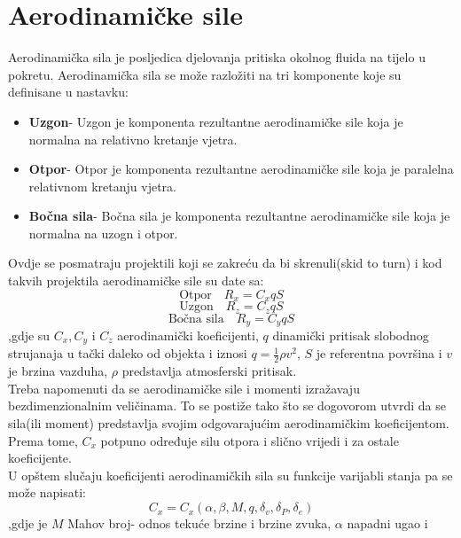 \section{Aerodinamičke sile}
Aerodinamička sila je posljedica djelovanja pritiska okolnog fluida na tijelo u pokretu. 
Aerodinamička sila se može razložiti na tri komponente koje su definisane u nastavku:
\begin{itemize}
    \item \textbf{Uzgon}- Uzgon je komponenta rezultantne aerodinamičke sile 
    koja je normalna na relativno kretanje vjetra.
    \item \textbf{Otpor}- Otpor je komponenta rezultantne aerodinamičke sile 
    koja je paralelna relativnom kretanju vjetra.
    \item \textbf{Bočna sila}- Bočna sila je komponenta rezultantne aerodinamičke sile 
    koja je normalna na uzogn i otpor. 
\end{itemize}
Ovdje se posmatraju projektili koji se zakreću da bi skrenuli(skid to turn) i 
kod takvih projektila aerodinamičke sile su date sa:
\begin{equation}
   \text{Otpor} \quad R_x=C_xqS
   \label{eq:aa1}
\end{equation}
\begin{equation}
    \text{Uzgon} \quad R_z=C_zqS
    \label{eq:aa2}
\end{equation}
\begin{equation}
    \text{Bočna sila} \quad R_y=C_yqS
    \label{eq:aa3}
\end{equation}
,gdje su $C_x,C_y$ i $C_z$ aerodinamički koeficijenti, $q$ dinamički pritisak slobodnog strujanaja
u tački daleko od objekta i iznosi $q=\frac{1}{2}\rho v^2$, $S$ je referentna površina i 
$v$ je brzina vazduha, $\rho$ predstavlja atmosferski pritisak.\\
Treba napomenuti da se aerodinamičke sile i momenti izražavaju bezdimenzionalnim veličinama. 
To se postiže tako što se dogovorom utvrdi da se sila(ili moment) predstavlja svojim odgovarajućim 
aerodinamičkim koeficijentom. Prema tome, $C_x$ potpuno određuje silu otpora i slično vrijedi i 
za ostale koeficijente. \\
U opštem slučaju koeficijenti aerodinamičkih sila su funkcije varijabli stanja pa se može
napisati:
\begin{equation}
    C_x=C_x(\alpha ,\beta, M,q,\delta_v,\delta_P,\delta_e)
\end{equation}
,gdje je $M$ Mahov broj- odnos tekuće brzine i brzine zvuka, $\alpha$ napadni ugao i 
